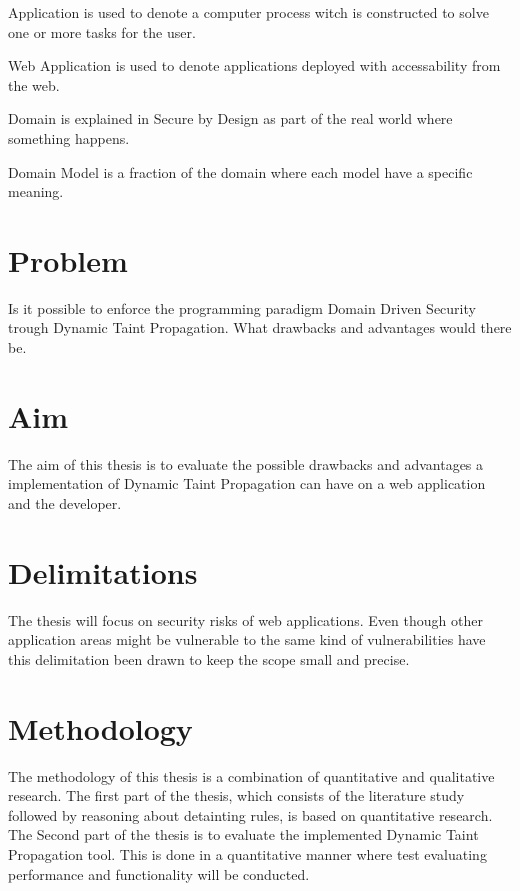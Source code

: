 \begin{definition}{Application} 
	is used to denote a computer process witch is constructed to solve one or more tasks for the user.
\end{definition}

\begin{definition}{Web Application} 
	is used to denote applications deployed with accessability from the web.
\end{definition}

\begin{definition}{Domain}
	is explained in Secure by Design \parencite{sbd2018} as part of the real world where something happens.
\end{definition}

\begin{definition}{Domain Model}
	is a fraction of the domain where each model have a specific meaning.
\end{definition}


\section{Problem}
Is it possible to enforce the programming paradigm Domain Driven Security trough Dynamic Taint Propagation. What drawbacks and advantages would there be.  


\section{Aim}
The aim of this thesis is to evaluate the possible drawbacks and advantages a implementation of Dynamic Taint Propagation can have on a web application and the developer.


\section{Delimitations}
The thesis will focus on security risks of web applications. Even though other application areas might be vulnerable to the same kind of vulnerabilities have this delimitation been drawn to keep the scope small and precise.


\section{Methodology}
The methodology of this thesis is a combination of quantitative and qualitative research. The first part of the thesis, which consists of the literature study followed by reasoning about detainting rules, is based on quantitative research. The Second part of the thesis is to evaluate the implemented Dynamic Taint Propagation tool. This is done in a quantitative manner where test evaluating performance and functionality will be conducted.
